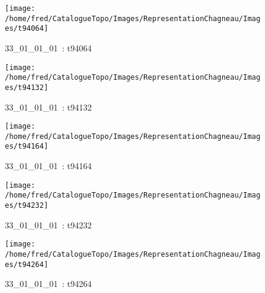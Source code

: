 \documentclass[12pt,titlepage]{book}
\begin{document}
\begin{figure}[h!]
\begin{minipage}[t]{3cm}
\begin{center}
    \end{center}
  \end{minipage}
  \begin{minipage}[t]{3cm}
    \begin{center}
      \texttt{[image: /home/fred/CatalogueTopo/Images/RepresentationChagneau/Images/t94064]}
      \caption[~33\_01\_01\_01]{\small{33\_01\_01\_01~:} \tiny{t94064}}\label{t94064}
    \end{center}
  \end{minipage}
  \begin{minipage}[t]{3cm}
    \begin{center}
      \texttt{[image: /home/fred/CatalogueTopo/Images/RepresentationChagneau/Images/t94132]}
      \caption[~33\_01\_01\_01]{\small{33\_01\_01\_01~:} \tiny{t94132}}\label{t94132}
    \end{center}
  \end{minipage}
  \begin{minipage}[t]{3cm}
    \begin{center}
      \texttt{[image: /home/fred/CatalogueTopo/Images/RepresentationChagneau/Images/t94164]}
      \caption[~33\_01\_01\_01]{\small{33\_01\_01\_01~:} \tiny{t94164}}\label{t94164}
    \end{center}
  \end{minipage}
  \begin{minipage}[t]{3cm}
    \begin{center}
      \texttt{[image: /home/fred/CatalogueTopo/Images/RepresentationChagneau/Images/t94232]}
      \caption[~33\_01\_01\_01]{\small{33\_01\_01\_01~:} \tiny{t94232}}\label{t94232}
    \end{center}
  \end{minipage}
  \begin{minipage}[t]{3cm}
    \begin{center}
      \texttt{[image: /home/fred/CatalogueTopo/Images/RepresentationChagneau/Images/t94264]}
      \caption[~33\_01\_01\_01]{\small{33\_01\_01\_01~:} \tiny{t94264}}\label{t94264}
    \end{center}
  \end{minipage}
  \begin{minipage}[t]{3cm}
    \begin{center}

\end{center}
\end{minipage}
\end{figure}
\end{document}
